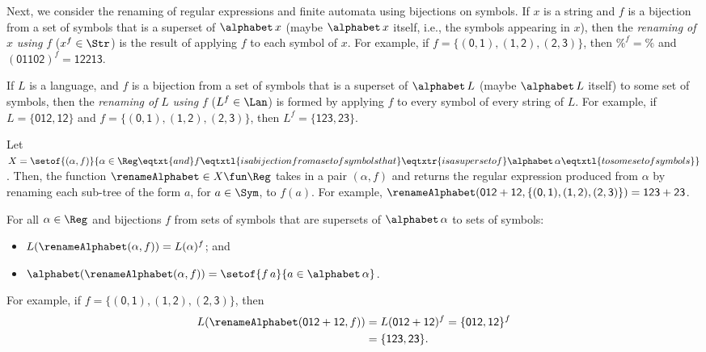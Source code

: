 Next, we consider the renaming of regular expressions and finite
automata using bijections on symbols.
If $x$ is a string and $f$ is a bijection from a set of symbols that
is a superset of $\alphabet\,x$ (maybe $\alphabet\,x$ itself, i.e.,
the symbols appearing in $x$), then the \emph{renaming of} $x$
\emph{using} $f$ ($x^f\in\Str$) is the result of applying $f$ to
%
%
%
%
each symbol of $x$.
For example, if $f=\mathsf{\{(0, 1), (1, 2), (2, 3)\}}$, then
$\%^f=\%$ and $(\mathsf{01102})^f=\mathsf{12213}$.

If $L$ is a language, and $f$ is a bijection from a set of symbols
that is a superset of $\alphabet\,L$ (maybe $\alphabet\,L$ itself)
to some set of symbols, then the \emph{renaming of} $L$ \emph{using}
%
%
%
%
$f$ ($L^f\in\Lan$) is formed by applying $f$ to every symbol of every string
of $L$.  For example, if $L=\{\mathsf{012, 12}\}$ and
$f=\mathsf{\{(0, 1), (1, 2), (2, 3)\}}$, then $L^f=\{\mathsf{123,
23}\}$.

Let $X=\setof{(\alpha,f)}{\alpha\in\Reg\eqtxt{and}f\eqtxtl{is a
bijection from a set of symbols that}\eqtxtr{is a superset
of}\alphabet\,\alpha\eqtxtl{to some set of symbols}}$.
Then, the function $\renameAlphabet\in X\fun\Reg$ takes in a pair
$(\alpha,f)$ and
%
%
%
returns the regular expression produced from $\alpha$ by renaming each
sub-tree of the form $a$, for $a\in\Sym$, to $f(a)$.
For example, $\renameAlphabet(\mathsf{012+12},
\mathsf{\{(0, 1), (1, 2), (2, 3)\}}) =
\mathsf{123+23}$.

\begin{theorem}
For all $\alpha\in\Reg$ and bijections $f$ from sets of symbols that
are supersets of $\alphabet\,\alpha$ to sets of symbols:
\begin{itemize}
\item $L(\renameAlphabet(\alpha,f)) = L(\alpha)^f$; and

\item $\alphabet(\renameAlphabet(\alpha,f)) =
\setof{f\,a}{a\in\alphabet\,\alpha}$.
\end{itemize}
\end{theorem}

For example, if $f=\mathsf{\{(0, 1), (1, 2), (2, 3)\}}$, then
\begin{align*}
L(\renameAlphabet(\mathsf{012+12}, f)) &=
L(\mathsf{012+12})^f=\{\mathsf{012,12}\}^f \\
&= \{\mathsf{123,23}\} .
\end{align*}

